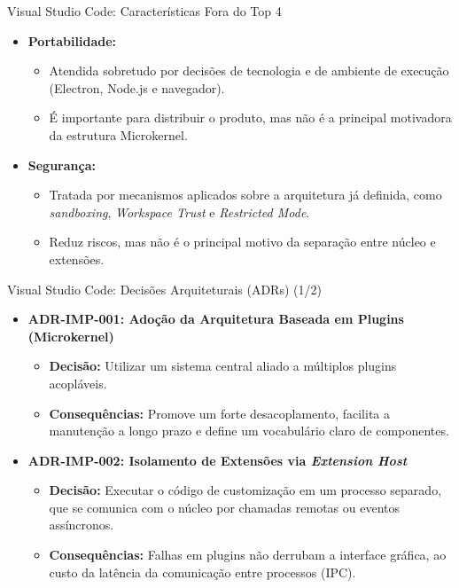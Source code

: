 \documentclass[aspectratio=169]{beamer}
\begin{document}
\begin{frame}{Visual Studio Code: Características Fora do Top 4}
\begin{itemize}\setlength{\itemsep}{0.8em}
\item \textbf{Portabilidade:}
  \begin{itemize}
  \item Atendida sobretudo por decisões de tecnologia e de ambiente de execução (Electron, Node.js e navegador).
  \item É importante para distribuir o produto, mas não é a principal motivadora da estrutura Microkernel.
  \end{itemize}
\item \textbf{Segurança:}
  \begin{itemize}
  \item Tratada por mecanismos aplicados sobre a arquitetura já definida, como \textit{sandboxing}, \textit{Workspace Trust} e \textit{Restricted Mode}.
  \item Reduz riscos, mas não é o principal motivo da separação entre núcleo e extensões.
  \end{itemize}
\end{itemize}
\end{frame}

\begin{frame}{Visual Studio Code: Decisões Arquiteturais (ADRs) (1/2)}
\begin{itemize}\setlength{\itemsep}{0.8em}
\item \textbf{ADR-IMP-001: Adoção da Arquitetura Baseada em Plugins (Microkernel)}
  \begin{itemize}
  \item \textbf{Decisão:} Utilizar um sistema central aliado a múltiplos plugins acopláveis.
  \item \textbf{Consequências:} Promove um forte desacoplamento, facilita a manutenção a longo prazo e define um vocabulário claro de componentes.
  \end{itemize}
\item \textbf{ADR-IMP-002: Isolamento de Extensões via \textit{Extension Host}}
  \begin{itemize}
  \item \textbf{Decisão:} Executar o código de customização em um processo separado, que se comunica com o núcleo por chamadas remotas ou eventos assíncronos.
  \item \textbf{Consequências:} Falhas em plugins não derrubam a interface gráfica, ao custo da latência da comunicação entre processos (IPC).
  \end{itemize}
\end{itemize}
\end{frame}
\end{document}
